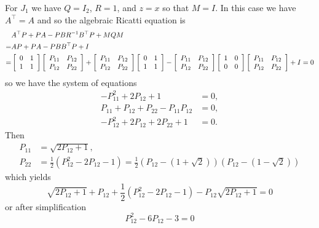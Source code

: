 \documentclass{article}
\begin{document}
For $J_1$ we have $Q = I_2$, $R = 1$, and $z = x$ so that
$M = I$. In this case we have $A^{\top} = A$ and so
the algebraic Ricatti equation is
\begin{align*}
   & A^\top P + P A - P B R^{-1} B^\top P + M Q M \\
 = & A P + P A - P B B^\top P + I \\
 = &
\left[\begin{array}{c c}
0 & 1 \\
1 & 1
\end{array}\right]
\left[\begin{array}{c c}
P_{11} & P_{12} \\
P_{12} & P_{22}
\end{array}\right]
+
\left[\begin{array}{c c}
P_{11} & P_{12} \\
P_{12} & P_{22}
\end{array}\right]
\left[\begin{array}{c c}
0 & 1 \\
1 & 1
\end{array}\right]
-
\left[\begin{array}{c c}
P_{11} & P_{12} \\
P_{12} & P_{22}
\end{array}\right]
\left[\begin{array}{c c}
1 & 0 \\
0 & 0
\end{array}\right]
\left[\begin{array}{c c}
P_{11} & P_{12} \\
P_{12} & P_{22}
\end{array}\right]
+
I = 0
\end{align*}
so we have the system of equations
\begin{align*}
  - P_{11}^2 + 2 P_{12} + 1 &= 0, \\
    P_{11}   +   P_{12} + P_{22} - P_{11} P_{12} &= 0, \\
  - P_{12}^2 + 2 P_{12} + 2 P_{22} + 1 &= 0.
\end{align*}
Then
\begin{align*}
P_{11} &= \sqrt{2 P_{12} + 1}, \\
P_{22} &= \frac{1}{2} (P_{12}^2 - 2 P_{12} - 1)
       = \frac{1}{2} (P_{12} - (1 + \sqrt{2}))(P_{12} - (1 - \sqrt{2}))
\end{align*}
which yields
$$
\sqrt{2 P_{12} + 1}
+ P_{12}
+ \frac{1}{2}(P_{12}^2 - 2P_{12} - 1)
- P_{12} \sqrt{2 P_{12} + 1} = 0
$$
or after simplification
$$
P_{12}^2 - 6P_{12} - 3 = 0
$$
\end{document}
